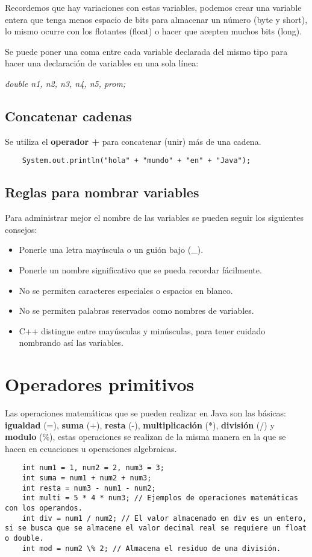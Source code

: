 Recordemos que hay variaciones con estas variables, podemos crear una variable entera que tenga menos espacio de bits para almacenar un número (byte y short), lo mismo ocurre con los flotantes (float) o hacer que acepten muchos bits (long).

Se puede poner una coma entre cada variable declarada del mismo tipo para hacer una declaración de variables en una sola línea:
\begin{center}
    \textit{double n1, n2, n3, n4, n5, prom;}
\end{center}


\subsection{Concatenar cadenas}

Se utiliza el \textbf{operador +} para concatenar (unir) más de una cadena.
\begin{lstlisting}
    System.out.println("hola" + "mundo" + "en" + "Java");
\end{lstlisting}


\subsection{Reglas para nombrar variables}

Para administrar mejor el nombre de las variables se pueden seguir los siguientes consejos:
\begin{itemize}
    \item Ponerle una letra mayúscula o un guión bajo (\_).
    \item Ponerle un nombre significativo que se pueda recordar fácilmente.
    \item No se permiten caracteres especiales o espacios en blanco.
    \item No se permiten palabras reservados como nombres de variables.
    \item C++ distingue entre mayúsculas y minúsculas, para tener cuidado nombrando así las variables.
\end{itemize}



\section{Operadores primitivos}

Las operaciones matemáticas que se pueden realizar en Java son las básicas: \textbf{igualdad} (=), \textbf{suma} (+), \textbf{resta} (-), \textbf{multiplicación} (*), \textbf{división} (/) y \textbf{modulo} (\%), estas operaciones se realizan de la misma manera en la que se hacen en ecuaciones u operaciones algebraicas.
\begin{lstlisting}
    int num1 = 1, num2 = 2, num3 = 3;
    int suma = num1 + num2 + num3;
    int resta = num3 - num1 - num2;
    int multi = 5 * 4 * num3; // Ejemplos de operaciones matemáticas con los operandos.
    int div = num1 / num2; // El valor almacenado en div es un entero, si se busca que se almacene el valor decimal real se requiere un float o double.
    int mod = num2 \% 2; // Almacena el residuo de una división.
\end{lstlisting}


